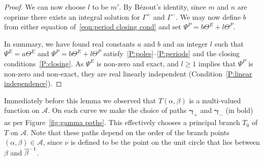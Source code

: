 \documentclass{article}
\begin{document}
\begin{lem}
\begin{proof}
We can now choose $l$ to be $m'$. By B\'ezout's identity, since $m$ and $n$ are coprime there exists an integral solution for $\Gamma^+$ and $\Gamma^-$. We may now define $b$ from either equation of~\eqref{eqn:period closing cond} and set $\Psi^P = b\Theta^E + l\Theta^P$.

In summary, we have found real constants $a$ and $b$ and an integer $l$ such that $\Psi^E = a\Theta^E$ and $\Psi^P = b\Theta^E + l\Theta^P$ satisfy~\ref{P:poles}--\ref{P:periods} and the closing conditions~\ref{P:closing}. As $\Psi^E$ is non-zero and exact, and $l\geq 1$ implies that $\Psi^P$ is non-zero and non-exact, they are real linearly independent (Condition~\ref{P:linear independence}).
\end{proof}
\end{lem}


Immediately before this lemma we observed that $T(\alpha,\beta)$ is a multi-valued function on $\mathcal{A}$. 
On each curve we make the choice of paths $\boldsymbol{\gamma}_+$ and $\boldsymbol{\gamma}_-$ (in bold) as per Figure~\ref{fig:gamma paths}. This effectively chooses a principal branch $T_0$ of $T$ on $\mathcal{A}$. Note that these paths depend on the order of the branch points $(\alpha,\beta) \in \mathcal{A}$, since $\nu$ is defined to be the point on the unit circle that lies between $\beta$ and $\overline{\beta}^{-1}$.
\end{document}
